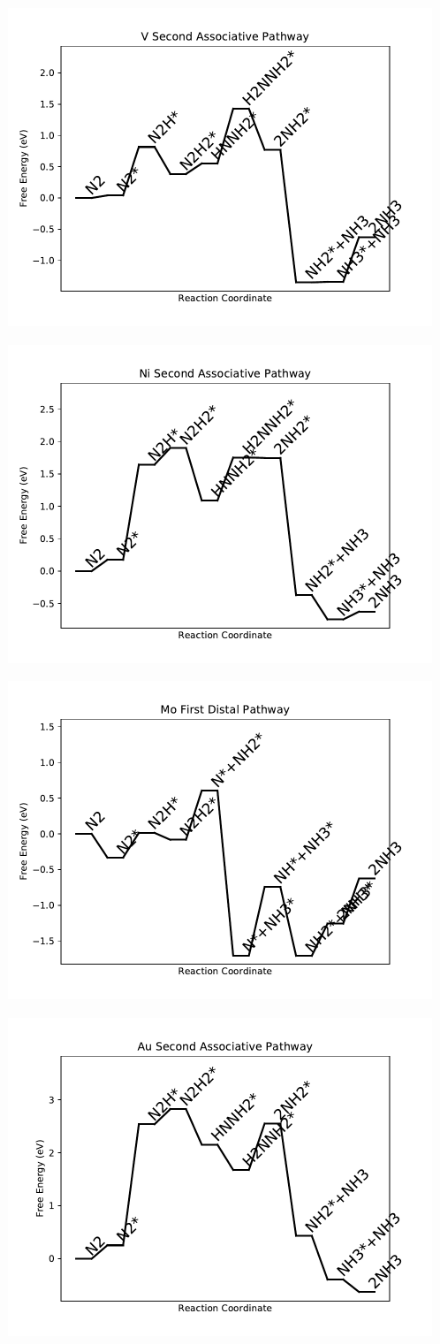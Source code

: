 \begin{figure}
\includegraphics[width=0.5\linewidth]{data/plots/V_associative_2.pdf}
\label{fig:V_associative_2}
\end{figure}

\begin{figure}
\includegraphics[width=0.5\linewidth]{data/plots/Ni_associative_2.pdf}
\label{fig:Ni_associative_2}
\end{figure}

\begin{figure}
\includegraphics[width=0.5\linewidth]{data/plots/Mo_distal_1.pdf}
\label{fig:Mo_distal_1}
\end{figure}

\begin{figure}
\includegraphics[width=0.5\linewidth]{data/plots/Au_associative_2.pdf}
\label{fig:Au_associative_2}
\end{figure}

